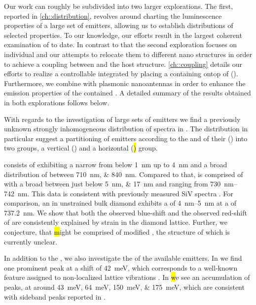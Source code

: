    Our work can roughly be subdivided into two larger explorations. The first, reported in \autoref{ch::distribution}, revolves around charting the luminescence properties of a large set of emitters, allowing us to establish distributions of selected \siv properties. To our knowledge, our efforts result in the largest coherent examination of \sivs to date. In contrast to that the second exploration focuses on individual \nds and our attempts to relocate them to different nano structures in order to achieve a coupling between \sivs and the host structure. \autoref{ch::coupling} details our efforts to realize a controllable integrated \sps by placing a \nd containing \sivs ontop of \vcsel (\VCSEL). Furthermore, we combine \nds with plasmonic nanoantennas in order to enhance the emission properties of the contained \sivs. A detailed summary of the results obtained in both explorations follows below.


   With regards to the investigation of large sets of emitters we find a previously unknown strongly inhomogeneous distribution of \siv spectra in \nds. The distribution in particular suggest a partitioning of emitters according to the \wl and \lw of their \zpls (\ZPL) into two groups, a vertical (\vl) and a horizontal (\hl) group.

   \Hl consists of \ZPLs exhibiting a narrow \lw from below \SI{1}{nm} up to \SI{4}{nm} and a broad distribution of \cwl between \SIlist{710;840}{nm}.
   Compared to that, \vl is comprised of \ZPLs with a broad \lw between just below \SIlist{5; 17}{nm} and \cwl ranging from \SIrange{730}{742}{nm}.
   This data is consistent with previously measured SiV spectra \cite{Benedikter2017a,Neu2012}.
   For comparison, an \siv in unstrained bulk diamond exhibits a \lw of \SIrange{4}{5}{nm} at a \cwl of \SI{737.2}{nm}\cite{Arend2016a,Dietrich2014}.
   We show that both the observed blue-shift and the observed red-shift of \vl are consistently explained by strain in the diamond lattice.
   Further, we conjecture, that \hl might be comprised of modified \sivs, the structure of which is currently unclear.

   In addition to the \zpl, we also investigate the \psb of the available emitters. In \vl we find one prominent peak at a shift of \SI{42}{meV}, which corresponds to a well-known feature assigned to non-localized lattice vibrations \cite{Larkins1971,Sternschulte1994}.
   In \hl we see an accumulation of peaks, at around \SIlist{43;64;150;175}{meV}, which are consistent with sideband peaks reported in \cite{Sternschulte1994,Zaitsev2001,Neu2011}.

